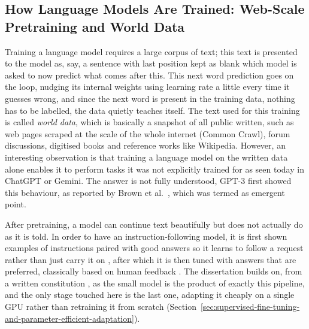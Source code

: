 \subsection{How Language Models Are Trained: Web-Scale Pretraining and World Data}
\label{subsec:training-and-world-data}

Training a language model requires a large corpus of text; this text is presented to the model as, say, a sentence with last position kept as blank which model is asked to now predict what comes after this. This next word prediction goes on the loop, nudging its internal weights using learning rate a little every time it guesses wrong, and since the next word is present in the training data, nothing has to be labelled, the data quietly teaches itself. The text used for this training is called \emph{world data}, which is basically a snapshot of all public written, such as web pages scraped at the scale of the whole internet (Common Crawl), forum discussions, digitised books and reference works like Wikipedia. However, an interesting observation is that training a language model on the written data alone enables it to perform tasks it was not explicitly trained for as seen today in ChatGPT or Gemini. The answer is not fully understood, GPT-3 first showed this behaviour, as reported by Brown et al.\ \cite{brown2020languagemodelsfewshotlearners}, which was termed as emergent point.

After pretraining, a model can continue text beautifully but does not actually do as it is told. In order to have an instruction-following model, it is first shown examples of instructions paired with good answers so it learns to follow a request rather than just carry it on \cite{wei2022finetunedlanguagemodelszeroshot}, after which it is then tuned with answers that are preferred, classically based on human feedback \cite{ouyang2022traininglanguagemodelsfollow}. The dissertation builds on, from a written constitution \cite{bai2022constitutionalaiharmlessnessai}, as the small model is the product of exactly this pipeline, and the only stage touched here is the last one, adapting it cheaply on a single GPU rather than retraining it from scratch (Section~\ref{sec:supervised-fine-tuning-and-parameter-efficient-adaptation}).

